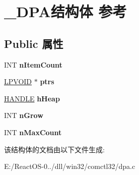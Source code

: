 \hypertarget{struct___d_p_a}{}\section{\+\_\+\+D\+P\+A结构体 参考}
\label{struct___d_p_a}
\subsection*{Public 属性}
\begin{DoxyCompactItemize}
\item 
\mbox{\label{struct___d_p_a_a9de679c567c86836ba41cb36286104bc}} 
I\+NT {\bfseries n\+Item\+Count}
\item 
\mbox{\label{struct___d_p_a_a8d93431cc386916fbc7fc7a9c7839b0f}} 
\hyperlink{interfacevoid}{L\+P\+V\+O\+ID} $\ast$ {\bfseries ptrs}
\item 
\mbox{\label{struct___d_p_a_a0f2d237bda7e81c25f2768e84ec19d59}} 
\hyperlink{interfacevoid}{H\+A\+N\+D\+LE} {\bfseries h\+Heap}
\item 
\mbox{\label{struct___d_p_a_a5a6b73ad40bcaede772b3551e2843431}} 
I\+NT {\bfseries n\+Grow}
\item 
\mbox{\label{struct___d_p_a_ad640ea4e742c933bc019d11f3dbc5d73}} 
I\+NT {\bfseries n\+Max\+Count}
\end{DoxyCompactItemize}


该结构体的文档由以下文件生成\+:\begin{DoxyCompactItemize}
\item 
E\+:/\+React\+O\+S-\/0../dll/win32/comctl32/dpa.\+c\end{DoxyCompactItemize}
